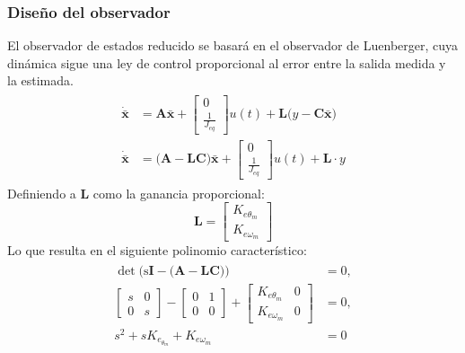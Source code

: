 \documentclass[12pt, a4paper,journal, onecolumn, compsoc]{IEEEtran}
\begin{document}
\subsubsection{Diseño del observador}
    El observador de estados reducido se basará en el observador de Luenberger, cuya dinámica sigue una ley de control proporcional al error entre la salida medida y la estimada.
    \begin{gather*}
    \begin{aligned}
    \dot{\bm{\bar x}}&=
    \mathrm{\bm{A}}
    \bm{\bar x} + 
    \begin{bmatrix}
    0 \\ \frac{1}{J_{eq}} 
    \end{bmatrix} u(t)+
    \mathrm{\bm{L}}\big(y -
    \mathrm{\bm{C}}\bm{\bar x}\big)\\
        \dot{\bm{\bar x}}&=
    \big(\mathrm{\bm{A}-\mathrm{\bm{L}}\mathrm{\bm{C}}\big)}\bm{\bar x} + 
    \begin{bmatrix}
    0 \\ \frac{1}{J_{eq}} 
    \end{bmatrix} u(t)+\mathrm{\bm{L}}\cdot y
    \end{aligned}
    \end{gather*}
    Definiendo a $\mathrm{\bm{L}}$ como la ganancia proporcional:
    \begin{equation*}
        \mathrm{\bm{L}}=
        \begin{bmatrix}
            K_{e\theta_m}\\
            K_{e\omega_m}
        \end{bmatrix}
    \end{equation*}
    Lo que resulta en el siguiente polinomio característico:
    \begin{gather*}
    \begin{aligned}
        \det \Big(\mathrm{s\bm{I-\big(A}}-\mathrm{\bm{LC}\big)}\Big)&=0,\\
        \begin{bmatrix}
            s & 0 \\ 
            0 & s
        \end{bmatrix}-
        \begin{bmatrix}
            0 & 1 \\
            0 & 0
        \end{bmatrix}+
        \begin{bmatrix}
            K_{e\theta_m} & 0 \\
            K_{e\omega_m} & 0
        \end{bmatrix} &=0,
        \\
        s^2 + s K_{e_{\theta_m}}+K_{e\omega_m}&=0
    \end{aligned}
    \end{gather*}
\end{document}
